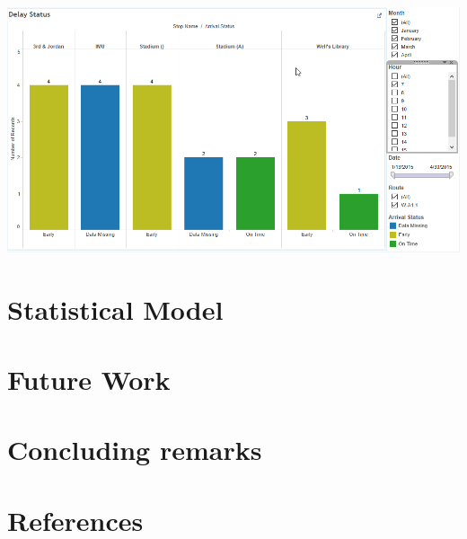 \documentclass[12pt]{article}
\begin{document}
\includegraphics[scale=0.55]{resources/tableau3}\\[1cm] \section{Statistical Model}
\section{Future Work}
\section{Concluding remarks}
\section{References}
\end{document}
